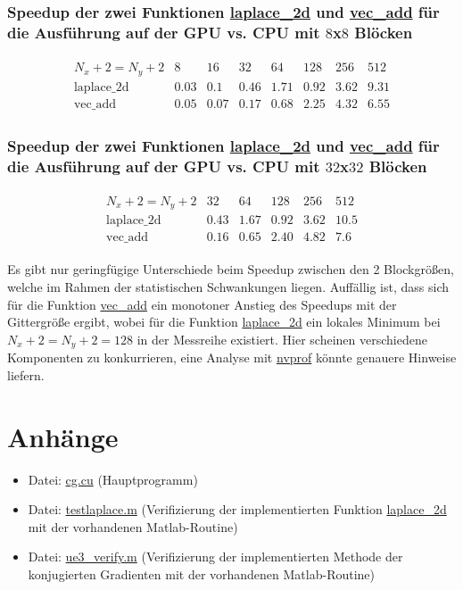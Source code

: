 \documentclass[%
	paper=A4,	%
	pagesize,	%
	DIV=calc,	%
	smallheadings,	%
	ngerman		%
]{scrartcl}
\begin{document}
\subsubsection*{Speedup der zwei Funktionen \url{laplace_2d} und \url{vec_add} für die Ausführung auf der GPU vs. CPU mit $8$x$8$ Blöcken}
\begin{eqnarray} \nonumber
	\begin{array}{l|c|c|c|c|c|c|c}
 N_x+2=N_y+2 & 8 & 16 & 32 & 64 & 128 & 256 & 512 \\ \hline
 \mbox{laplace\_2d} & 0.03 & 0.1 & 0.46 & 1.71 & 0.92 & 3.62 & 9.31 \\
 \mbox{vec\_add} & 0.05 & 0.07 & 0.17 & 0.68 & 2.25 & 4.32 & 6.55
	\end{array}
\end{eqnarray}

\subsubsection*{Speedup der zwei Funktionen \url{laplace_2d} und \url{vec_add} für die Ausführung auf der GPU vs. CPU mit $32$x$32$ Blöcken}
\begin{eqnarray} \nonumber
	\begin{array}{l|c|c|c|c|c}
 N_x+2=N_y+2 & 32 & 64 & 128 & 256 & 512 \\ \hline
 \mbox{laplace\_2d} & 0.43 & 1.67 & 0.92 & 3.62 & 10.5 \\
 \mbox{vec\_add} & 0.16 & 0.65 & 2.40 & 4.82 & 7.6
	\end{array}
\end{eqnarray}

Es gibt nur geringfügige Unterschiede beim Speedup zwischen den 2 Blockgrößen, welche im Rahmen der statistischen Schwankungen liegen. Auffällig ist, dass sich für die Funktion \url{vec\_add} ein monotoner Anstieg des Speedups mit der Gittergröße ergibt, wobei für die Funktion \url{laplace\_2d} ein lokales Minimum bei $N_x+2=N_y+2=128$ in der Messreihe existiert. Hier scheinen verschiedene Komponenten zu konkurrieren, eine Analyse mit \url{nvprof} könnte genauere Hinweise liefern.

\section*{Anhänge}
\begin{itemize}
	\item Datei: \url{cg.cu} (Hauptprogramm)
	\item Datei: \url{testlaplace.m} (Verifizierung der implementierten Funktion \url{laplace\_2d} mit der vorhandenen Matlab-Routine)
	\item Datei: \url{ue3_verify.m} (Verifizierung der implementierten Methode der konjugierten Gradienten mit der vorhandenen Matlab-Routine)
\end{itemize}
\end{document}

